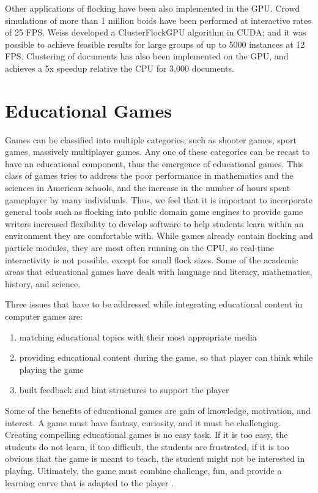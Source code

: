 Other applications of flocking have been also implemented in the GPU.  Crowd simulations of more than 1 million boids have been performed\cite{supermassiveCrowd} at interactive rates of 25 FPS.  
Weiss developed a ClusterFlockGPU algorithm\cite{SI_GPU}  in CUDA; and it was possible to achieve feasible results for large groups of up to 5000 instances at 12 FPS. Clustering of documents has also been implemented on the GPU\cite{document2}, and achieves a 5x speedup relative the CPU for 3,000 documents. 

\section{Educational Games}
Games can be classified into multiple categories, such as shooter games, sport games, 
massively multiplayer games. Any one of these categories can be recast to have an 
educational component, thus the emergence of
educational games. This class of games tries to address the poor performance in 
mathematics and the sciences in American schools, and the increase in the number of hours spent gameplayer by many individuals. Thus, we feel that it is important to incorporate 
general tools such as flocking into public domain game engines to 
provide game writers increased flexibility to develop software to help students learn within an environment they are comfortable with. While games already contain flocking and particle modules, they are most often running on the CPU, so real-time interactivity is not possible, except for small flock sizes. 
Some of the academic areas that educational games have dealt with  
language and literacy, mathematics, history, and science\cite{makingDesignGames}. 

Three issues that have to be addressed while integrating educational content in computer games are\cite{educationalComputerGames}:
\begin{enumerate}
\item{matching educational topics with their most appropriate media}
\item{providing educational content during the game, so that player can think while playing 
the game}
\item{built feedback and hint structures to support the player} 
\end{enumerate} 
Some of the benefits of educational games are gain of knowledge, motivation, and interest. A game must have fantasy, curiosity, and it must be challenging. Creating compelling 
educational games is no easy task. If it is too easy, the students do not learn, if too 
difficult, the students are frustrated, if it is too obvious that the game is meant to teach, the student might not be interested in playing. Ultimately, the game must combine challenge, fun, and provide a learning curve that is adapted to the player 
\cite{computerGamesEducationalTool}.

